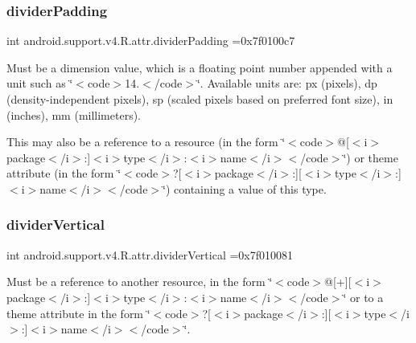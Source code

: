 \subsubsection{\texorpdfstring{divider\+Padding}{dividerPadding}}
{\footnotesize\ttfamily int android.\+support.\+v4.\+R.\+attr.\+divider\+Padding =0x7f0100c7\hspace{0.3cm}{\ttfamily [static]}}

Must be a dimension value, which is a floating point number appended with a unit such as \char`\"{}$<$code$>$14.\+5sp$<$/code$>$\char`\"{}. Available units are\+: px (pixels), dp (density-\/independent pixels), sp (scaled pixels based on preferred font size), in (inches), mm (millimeters). 

This may also be a reference to a resource (in the form \char`\"{}$<$code$>$@\mbox{[}$<$i$>$package$<$/i$>$\+:\mbox{]}$<$i$>$type$<$/i$>$\+:$<$i$>$name$<$/i$>$$<$/code$>$\char`\"{}) or theme attribute (in the form \char`\"{}$<$code$>$?\mbox{[}$<$i$>$package$<$/i$>$\+:\mbox{]}\mbox{[}$<$i$>$type$<$/i$>$\+:\mbox{]}$<$i$>$name$<$/i$>$$<$/code$>$\char`\"{}) containing a value of this type. \mbox{\label{classandroid_1_1support_1_1v4_1_1R_1_1attr_a94bef3415e2e39d667f0fecd21873aaa}} 
\subsubsection{\texorpdfstring{divider\+Vertical}{dividerVertical}}
{\footnotesize\ttfamily int android.\+support.\+v4.\+R.\+attr.\+divider\+Vertical =0x7f010081\hspace{0.3cm}{\ttfamily [static]}}

Must be a reference to another resource, in the form \char`\"{}$<$code$>$@\mbox{[}+\mbox{]}\mbox{[}$<$i$>$package$<$/i$>$\+:\mbox{]}$<$i$>$type$<$/i$>$\+:$<$i$>$name$<$/i$>$$<$/code$>$\char`\"{} or to a theme attribute in the form \char`\"{}$<$code$>$?\mbox{[}$<$i$>$package$<$/i$>$\+:\mbox{]}\mbox{[}$<$i$>$type$<$/i$>$\+:\mbox{]}$<$i$>$name$<$/i$>$$<$/code$>$\char`\"{}. \mbox{\label{classandroid_1_1support_1_1v4_1_1R_1_1attr_a158e95bf8e6d89159dc97c65f16f1957}} 
